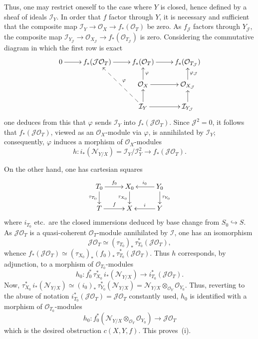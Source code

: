 Thus, one may restrict oneself to the case where \(Y\) is closed, hence defined by a sheaf of ideals \(\mathcal{I}_{Y}\). In order that \(f\) factor through \(Y\), it is necessary and sufficient that the composite map \(\mathcal{I}_{Y}\to\mathcal{O}_{X}\to f_{*}(\mathcal{O}_{T})\) be zero. As \(f_{\mathcal{J}}\) factors through \(Y_{\mathcal{J}}\), the composite map \(\mathcal{I}_{Y_{\mathcal{J}}}\to\mathcal{O}_{X_{\mathcal{J}}}\to f_{*}(\mathcal{O}_{T_{\mathcal{J}}})\) is zero. Considering the commutative diagram in which the first row is exact
\[
\xymatrix@C=2.4em@R=1.6em{
0 \ar[r]
& f_{*}(\mathcal{J}\mathcal{O}_{T}) \ar[r]
& f_{*}(\mathcal{O}_{T}) \ar[r]
& f_{*}(\mathcal{O}_{T_{\mathcal{J}}})
\\
&
& \mathcal{O}_{X} \ar[u]_{\varphi} \ar[r]
& \mathcal{O}_{X_{\mathcal{J}}} \ar[u]_{\varphi_{\mathcal{J}}}
\\
&
& \mathcal{I}_{Y} \ar[u] \ar[r] \ar@{-->}[uul]_{\varphi}
& \mathcal{I}_{Y_{\mathcal{J}}} \ar[u]
}
\]
one deduces from this that \(\varphi\) sends \(\mathcal{I}_{Y}\) into \(f_{*}(\mathcal{J}\mathcal{O}_{T})\).%
{\renewcommand{\thefootnote}{(96)}}
Since \(\mathcal{J}^{2}=0\), it follows that \(f_{*}(\mathcal{J}\mathcal{O}_{T})\), viewed as an \(\mathcal{O}_{X}\)-module via \(\varphi\), is annihilated by \(\mathcal{I}_{Y}\); consequently, \(\varphi\) induces a morphism of \(\mathcal{O}_{X}\)-modules
\[
h\colon
i_{*}(\mathcal{N}_{Y/X})=\mathcal{I}_{Y}/\mathcal{I}_{Y}^{2}
\longrightarrow
f_{*}(\mathcal{J}\mathcal{O}_{T}).
\]

On the other hand, one has cartesian squares
\[
\xymatrix@C=2.6em@R=1.8em{
T_{0} \ar[r]^{f_{0}} \ar[d]_{\tau_{T_{0}}}
& X_{0} \ar[d]_{\tau_{X_{0}}}
& Y_{0} \ar[l]_{i_{0}} \ar[d]^{\tau_{Y_{0}}}
\\
T \ar[r]^{f}
& X
& Y \ar[l]_{i}
}
\]
where \(i_{T_{0}}\) etc.\ are the closed immersions deduced by base change from \(S_{0}\hookrightarrow S\). As \(\mathcal{J}\mathcal{O}_{T}\) is a quasi-coherent \(\mathcal{O}_{T}\)-module annihilated by \(\mathcal{I}\), one has an isomorphism
\[
\mathcal{J}\mathcal{O}_{T}
\simeq
(\tau_{T_{0}})_{*}\,\tau_{T_{0}}^{*}(\mathcal{J}\mathcal{O}_{T}),
\]
whence \(f_{*}(\mathcal{J}\mathcal{O}_{T})\simeq(\tau_{X_{0}})_{*}(f_{0})_{*}\,\tau_{T_{0}}^{*}(\mathcal{J}\mathcal{O}_{T})\). Thus \(h\) corresponds, by adjunction, to a morphism of \(\mathcal{O}_{T_{0}}\)-modules
\[
h_{0}\colon
f_{0}^{*}\,\tau_{X_{0}}^{*}\,i_{*}(\mathcal{N}_{Y/X})
\longrightarrow
i_{T_{0}}^{*}(\mathcal{J}\mathcal{O}_{T}).
\]
Now, \(\tau_{X_{0}}^{*}\,i_{*}(\mathcal{N}_{Y/X})\simeq(i_{0})_{*}\,\tau_{Y_{0}}^{*}(\mathcal{N}_{Y/X})=\mathcal{N}_{Y/X}\otimes_{\mathcal{O}_{Y}}\mathcal{O}_{Y_{0}}\). Thus, reverting to the abuse of notation \(i_{T_{0}}^{*}(\mathcal{J}\mathcal{O}_{T})=\mathcal{J}\mathcal{O}_{T}\) constantly used, \(h_{0}\) is identified with a morphism of \(\mathcal{O}_{T_{0}}\)-modules
\[
h_{0}\colon
f_{0}^{*}(\mathcal{N}_{Y/X}\otimes_{\mathcal{O}_{Y}}\mathcal{O}_{Y_{0}})
\longrightarrow
\mathcal{J}\mathcal{O}_{T}
\]
which is the desired obstruction \(c(X,Y,f)\). This proves~(i).

